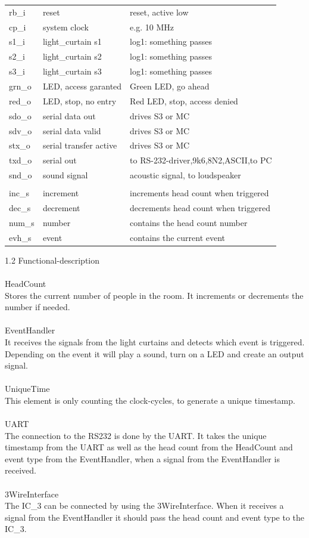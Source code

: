 \documentclass[a4paper,12pt]{book}
\begin{document}
\begin{center}
\begin{tabular}{lll}
rb{\_}i & reset & reset, active low \\
cp{\_}i & system clock & e.g. 10 MHz \\
s1{\_}i & light{\_}curtain s1 & log1: something passes \\
s2{\_}i & light{\_}curtain s2& log1: something passes \\
s3{\_}i & light{\_}curtain s3 & log1: something passes \\
grn{\_}o & LED, access garanted & Green LED, go ahead \\
red{\_}o & LED, stop, no entry & Red LED, stop, access denied \\
sdo{\_}o & serial data out & drives S3 or MC \\
sdv{\_}o & serial data valid & drives S3 or MC \\
stx{\_}o & serial transfer active & drives S3 or MC \\
txd{\_}o & serial out & to RS-232-driver,9k6,8N2,ASCII,to PC \\
snd{\_}o & sound signal & acoustic signal, to loudspeaker \\
\\
inc{\_}s & increment & increments head count when triggered \\
dec{\_}s & decrement & decrements head count when triggered \\
num{\_}s & number & contains the head count number \\
evh{\_}s & event & contains the current event \\
\end{tabular}
\end{center}

1.2 Functional-description \\
\\
HeadCount \\
Stores the current number of people in the room. It increments or decrements the number if needed.
\\
\\
EventHandler \\
It receives the signals from the light curtains and detects which event is triggered. Depending on the event it will play a sound, turn on a LED and create an output signal.
\\
\\
UniqueTime \\
This element is only counting the clock-cycles, to generate a unique timestamp.
\\
\\
UART \\
The connection to the RS232 is done by the UART. It takes the unique timestamp from the UART as well as the head count from the HeadCount and event type from the EventHandler, when a signal from the EventHandler is received.
\\
\\
3WireInterface \\
The IC{\_}3 can be connected by using the 3WireInterface. When it receives a signal from the EventHandler it should pass the head count and event type to the IC{\_}3.
\end{document}
